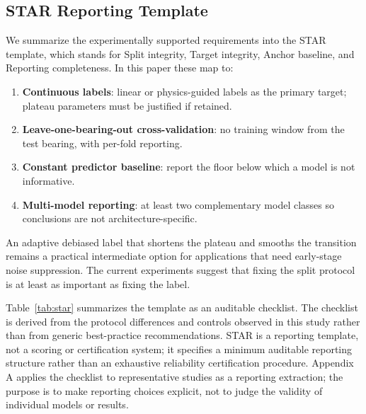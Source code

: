 \documentclass[pdflatex,sn-mathphys-num]{sn-jnl}
\begin{document}
\subsection{STAR Reporting Template}
We summarize the experimentally supported requirements into the STAR template, which stands for Split integrity, Target integrity, Anchor baseline, and Reporting completeness. In this paper these map to:
\begin{enumerate}
    \item \textbf{Continuous labels}: linear or physics-guided labels as the primary target; plateau parameters must be justified if retained.
    \item \textbf{Leave-one-bearing-out cross-validation}: no training window from the test bearing, with per-fold reporting.
    \item \textbf{Constant predictor baseline}: report the floor below which a model is not informative.
    \item \textbf{Multi-model reporting}: at least two complementary model classes so conclusions are not architecture-specific.
\end{enumerate}
An adaptive debiased label that shortens the plateau and smooths the transition remains a practical intermediate option for applications that need early-stage noise suppression. The current experiments suggest that fixing the split protocol is at least as important as fixing the label.

Table~\ref{tab:star} summarizes the template as an auditable checklist. The checklist is derived from the protocol differences and controls observed in this study rather than from generic best-practice recommendations. STAR is a reporting template, not a scoring or certification system; it specifies a minimum auditable reporting structure rather than an exhaustive reliability certification procedure. Appendix A applies the checklist to representative studies as a reporting extraction; the purpose is to make reporting choices explicit, not to judge the validity of individual models or results.

\begin{table}[t]
\centering
\caption{STAR evaluation template used as an auditable reporting checklist.}
\label{tab:star}
\small
{}
\end{table}
\end{document}
